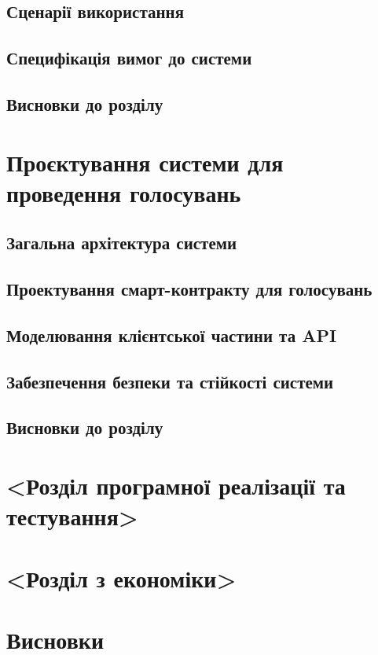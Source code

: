 \documentclass[14pt]{extreport}
\begin{document}
  \section{Сценарії використання}
  \section{Специфікація вимог до системи}
  \section{Висновки до розділу}

  \chapter{Проєктування системи для проведення голосувань}

  \section{Загальна архітектура системи}
  \section{Проектування смарт-контракту для голосувань}
  \section{Моделювання клієнтської частини та API}
  \section{Забезпечення безпеки та стійкості системи}
  \section{Висновки до розділу}
  
  \chapter{<Розділ програмної реалізації та тестування>}
  
  \chapter{<Розділ з економіки>}
  
  \chapter*{Висновки}
  
\end{document}
